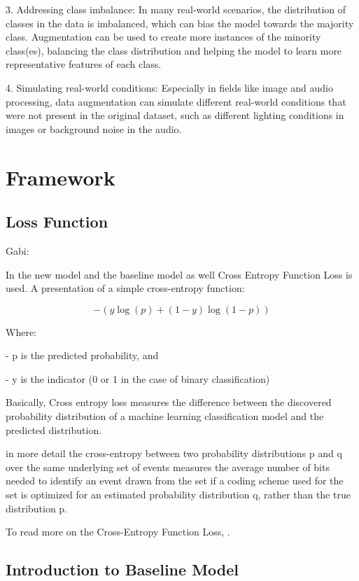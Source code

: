 \documentclass[a4paper]{article}
\begin{document}
3. Addressing class imbalance: In many real-world scenarios, the distribution of classes in the data is imbalanced, which can bias the model towards the majority class. Augmentation can be used to create more instances of the minority class(es), balancing the class distribution and helping the model to learn more representative features of each class.\newline

4. Simulating real-world conditions: Especially in fields like image and audio processing, data augmentation can simulate different real-world conditions that were not present in the original dataset, such as different lighting conditions in images or background noise in the audio.\newline

\section{Framework}

\subsection{Loss Function}

Gabi:

In the new model and the baseline model as well Cross Entropy Function Loss is used.
A presentation of a simple cross-entropy function:

$$-{(y\log(p) + (1 - y)\log(1 - p))}$$

Where:

- p is the predicted probability, and

- y is the indicator (0 or 1 in the case of binary classification)
\newline

Basically, Cross entropy loss measures the difference between the discovered probability distribution of a machine learning classification model and the predicted distribution.

in more detail the cross-entropy between two probability distributions 
p and q over the same underlying set of events measures the average number of bits needed to identify an event drawn from the set if a coding scheme used for the set is optimized for an estimated probability distribution 
q, rather than the true distribution p.

To read more on the Cross-Entropy Function Loss, \cite{chen2012cross}.


\subsection{Introduction to Baseline Model}
\end{document}
